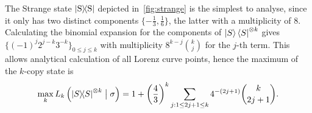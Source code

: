 \documentclass[pra,
aps,
twocolumn,
superscriptaddress,
groupedaddress,
nofootinbib,
reprint
]{revtex4-1}
\begin{document}
The Strange state $\ketbra{\rm{S}}$ depicted in~\cref{fig:strange} is the simplest to analyse, since it only has two distinct components $\{ -\frac{1}{3}, \frac{1}{6} \}$, the latter with a multiplicity of 8.
Calculating the binomial expansion for the components of $\ket{S}\bra{S}^{\otimes k}$ gives $\{(-1)^j 2^{j-k} 3^{-k}\}_{0 \leq j \leq k}$ with multiplicity $8^{k-j} \binom{k}{j}$ for the $j$-th term.
This allows analytical calculation of all Lorenz curve points, hence the maximum of the $k$-copy state is
\begin{equation}\label{eq:Skmax}
    \max_k{L_k \left( \ketbra{S}^{\otimes k} \bigm| \sigma \right)} = 1 + \left(\frac{4}{3}\right)^k \sum\limits_{j: 1 \leq 2j+1 \leq k} 4^{-(2j+1)} \binom{k}{2j+1}.
\end{equation}
\end{document}
